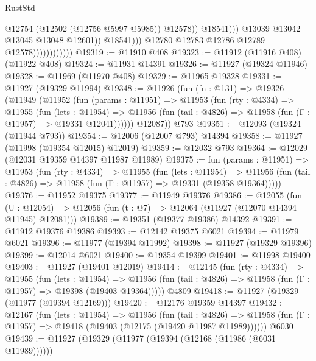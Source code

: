 \begin{lexlean}{RustStd}
\begin{coremodule}
                                                @12754
                                                (@12502 (@12756 @5997 @5985))
                                                @12578))
                                            @18541)))
                                      @13039
                                      @13042
                                      @13045
                                      @13048
                                      @12601))
                                  @18541)))
                            @12780
                            @12783
                            @12786
                            @12789
                            @12578))))))))))))
@19319 := @11910 @408
@19323 := @11912 (@11916 @408) (@11922 @408)
@19324 := @11931 @14391
@19326 := @11927 (@19324 @11946)
@19328 := @11969 (@11970 @408)
@19329 := @11965 @19328
@19331 := @11927 (@19329 @11994)
@19348 := @11926
    (fun (fn : @131) =>
    @19326
      (@11949
        (@11952
          (fun (params : @11951) =>
          @11953
            (fun (rty : @4334) =>
            @11955
              (fun (lets : @11954) =>
              @11956 (fun (tail : @4826) => @11958 (fun (Γ : @11957) => @19331 @12041))))))
        @12087))
    @793
@19351 := @12093 (@19324 (@11944 @793))
@19354 := @12006 (@12007 @793) @14394
@19358 := @11927 (@11998 (@19354 @12015) @12019)
@19359 := @12032 @793
@19364 := @12029 (@12031 @19359 @14397 @11987 @11989)
@19375 := fun (params : @11951) =>
  @11953
    (fun (rty : @4334) =>
    @11955
      (fun (lets : @11954) =>
      @11956 (fun (tail : @4826) => @11958 (fun (Γ : @11957) => @19331 (@19358 @19364)))))
@19376 := @11952 @19375
@19377 := @11949 @19376
@19386 := @12055
    (fun (U : @12054) => @12056 (fun (t : @7) => @12064 (@11927 (@12070 @14394 @11945) @12081)))
@19389 := @19351 (@19377 @19386) @14392
@19391 := @11912 @19376 @19386
@19393 := @12142 @19375 @6021
@19394 := @11979 @6021
@19396 := @11977 (@19394 @11992)
@19398 := @11927 (@19329 @19396)
@19399 := @12014 @6021
@19400 := @19354 @19399
@19401 := @11998 @19400
@19403 := @11927 (@19401 @12019)
@19414 := @12145
    (fun (rty : @4334) =>
    @11955
      (fun (lets : @11954) =>
      @11956 (fun (tail : @4826) => @11958 (fun (Γ : @11957) => @19398 (@19403 @19364)))))
    @4809
@19418 := @11927 (@19329 (@11977 (@19394 @12169)))
@19420 := @12176 @19359 @14397
@19432 := @12167
    (fun (lets : @11954) =>
    @11956
      (fun (tail : @4826) =>
      @11958 (fun (Γ : @11957) => @19418 (@19403 (@12175 (@19420 @11987 @11989))))))
    @6030
@19439 := @11927 (@19329 (@11977 (@19394 (@12168 (@11986 (@6031 @11989))))))

\end{coremodule}
\end{lexlean}
